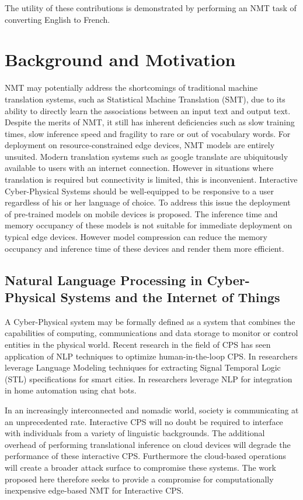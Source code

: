 \documentclass{sigchi}
\begin{document}
The utility of these contributions is demonstrated by performing an NMT task of converting English to French.

\section{Background and Motivation} 
\par NMT may potentially address the shortcomings of traditional machine translation systems, such as Statistical Machine Translation (SMT), due to its ability to directly learn the associations between an input text and output text.  Despite the merits of NMT, it still has inherent deficiencies such as slow training times, slow inference speed and fragility to rare or out of vocabulary words. For deployment on resource-constrained edge devices, NMT models are entirely unsuited. Modern translation systems such as google translate are ubiquitously available to users with an internet connection. However in situations where translation is required but connectivity is limited, this is inconvenient. Interactive Cyber-Physical Systems should be well-equipped to be responsive to a user regardless of his or her language of choice. To address this issue the deployment of pre-trained models on mobile devices is proposed. The inference time and memory occupancy of these models is not suitable for immediate deployment on typical edge devices. However model compression can reduce the memory occupancy and inference time of these devices and render them more efficient.

\subsection {Natural Language Processing in Cyber-Physical Systems and the Internet of Things}
\par A Cyber-Physical system may be formally defined as a system that combines the capabilities of computing, communications and data storage to monitor or control entities in the physical world. \cite{cpssurvey} Recent research in the field of CPS has seen application of NLP techniques to optimize human-in-the-loop CPS. In \cite{cityresolver} researchers leverage Language Modeling techniques for extracting Signal Temporal Logic (STL) specifications for smart cities. In \cite{cpsbots} researchers leverage NLP for integration in home automation using chat bots.

\par In an increasingly interconnected and nomadic world, society is communicating at an unprecedented rate. Interactive CPS will no doubt be required to interface with individuals from a variety of linguistic backgrounds. The additional overhead of performing translational inference on cloud devices will degrade the performance of these interactive CPS. Furthermore the cloud-based operations will create a broader attack surface to compromise these systems. The work proposed here therefore seeks to provide a compromise for computationally inexpensive edge-based NMT for Interactive CPS.
\end{document}
